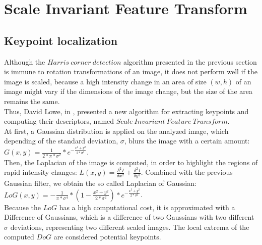 \section{Scale Invariant Feature Transform}
\subsection{Keypoint localization}
Although the $Harris\ corner\ detection$ algorithm presented in the previous section is immune to rotation transformations of an image, it does not perform well if the image is scaled, because a high intensity change in an area of size $(w, h)$ of an image might vary if the dimensions of the image change, but the size of the area remains the same.\\
Thus, David Lowe, in \cite{siftLowe}, presented a new algorithm for extracting keypoints and computing their descriptors, named $Scale\ Invariant\ Feature\ Transform$.\\
At first, a Gaussian distribution is applied on the analyzed image, which depending of the standard deviation, $\sigma$, blurs the image with a certain amount: $G(x, y) = \frac{1}{2 * \pi * \sigma^2} * e^{-\frac{x^2 + y^2}{2 * \sigma^2}}$.\\
Then, the Laplacian of the image is computed, in order to highlight the regions of rapid intensity changes: $L(x, y) = \frac{\delta^2 I}{\delta x^2} + \frac{\delta^2 I}{\delta y^2}$. Combined with the previous Gaussian filter, we obtain the so called Laplacian of Gaussian: $LoG(x, y) = -\frac{1}{\pi * \sigma^4} * \left(1 - \frac{x^2 + y^2}{2 * \sigma^2}\right) * e^{-\frac{x^2 + y^2}{2 * \sigma^2}}$.\\
Because the $LoG$ has a high computational cost, it is approximated with a Difference of Gaussians, which is a difference of two Gaussians with two different $\sigma$ deviations, representing two different scaled images. The local extrema of the computed $DoG$ are considered potential keypoints.

